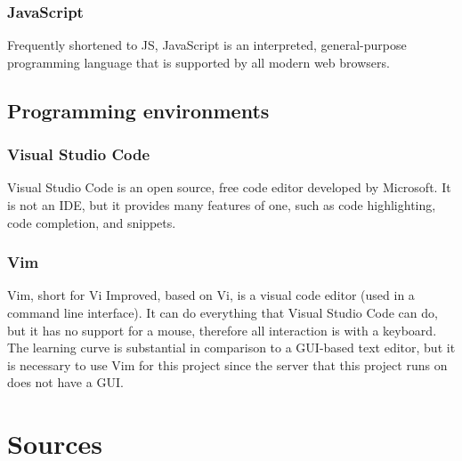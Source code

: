        \subsubsection{JavaScript}
        Frequently shortened to JS, JavaScript is an interpreted, general-purpose programming language that is supported by all modern web browsers.
    \subsection{Programming environments}
        \subsubsection{Visual Studio Code}
        Visual Studio Code is an open source, free code editor developed by Microsoft. It is not an IDE, but it provides many features of one, such as code highlighting, code completion, and snippets.
        \subsubsection{Vim}
        Vim, short for Vi Improved, based on Vi, is a visual code editor (used in a command line interface). It can do everything that Visual Studio Code can do, but it has no support for a mouse, therefore all interaction is with a keyboard. The learning curve is substantial in comparison to a GUI-based text editor, but it is necessary to use Vim for this project since the server that this project runs on does not have a GUI.


\section{Sources}
